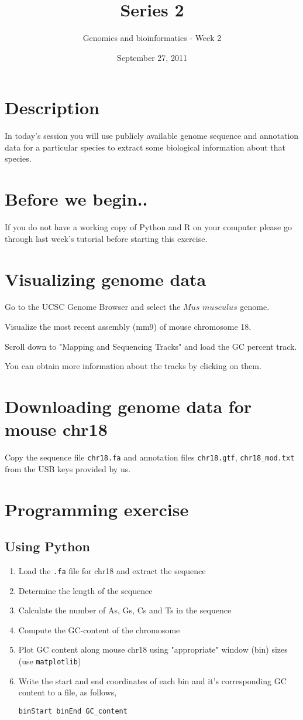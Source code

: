 \documentclass[a4paper,11pt]{article}
\title{Series 2}
\date{September 27, 2011}
\author{Genomics and bioinformatics - Week 2}
\begin{document}
\maketitle

\section{Description}
In today's session you will use publicly available genome sequence and annotation data for \indent a particular species
to extract some biological information about that species.

\section{Before we begin..}
If you do not have a working copy of Python and R on your computer please go through last week's tutorial before starting this exercise. 

\section{Visualizing genome data}

Go to the UCSC Genome Browser and select the $Mus$ $musculus$ genome.

Visualize the most recent assembly (mm9) of mouse chromosome 18.

Scroll down to "Mapping and Sequencing Tracks" and load the GC percent track. 

You can obtain more information about the tracks by clicking on them.  

\section{Downloading genome data for mouse chr18}
Copy the sequence file \texttt{chr18.fa} and annotation files \texttt{chr18.gtf}, \texttt{chr18\_mod.txt} from the USB keys provided by us. 

\section{Programming exercise}

\subsection{Using Python}
\begin{enumerate}
\item Load the \texttt{.fa} file for chr18 and extract the sequence
\item Determine the length of the sequence
\item Calculate the number of As, Gs, Cs and Ts in the sequence
\item Compute the GC-content of the chromosome
\item Plot GC content along mouse chr18 using "appropriate" window (bin) sizes (use  \texttt{matplotlib})
\item Write the start and end coordinates of each bin and it's corresponding GC content to a file, as follows,

\scriptsize\texttt {binStart binEnd	GC\_content}
\end{enumerate}
\end{document}
